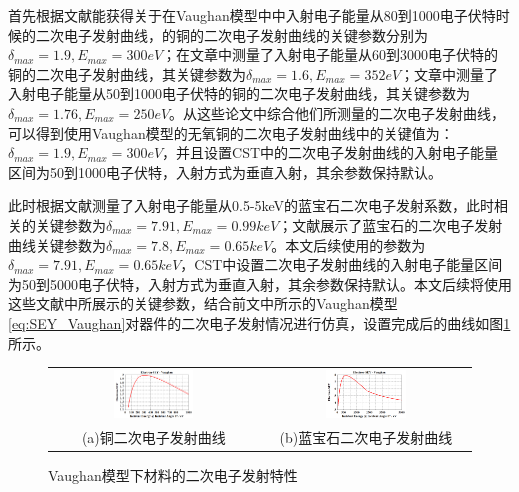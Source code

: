 \documentclass[master]{thesis-uestc}
\begin{document}
首先根据文献\cite{valizadeh_2014_wja}能获得关于在Vaughan模型中中入射电子能量从80到1000电子伏特时候的二次电子发射曲线，的铜的二次电子发射曲线的关键参数分别为$\delta_{max}=1.9, E_{max}=300 eV$；在文章\cite{bojko_2020_see}中测量了入射电子能量从60到3000电子伏特的铜的二次电子发射曲线，其关键参数为$\delta_{max}=1.6, E_{max}=352 eV$；文章\cite{jianweifang_lizi_2023}中测量了入射电子能量从50到1000电子伏特的铜的二次电子发射曲线，其关键参数为$\delta_{max}=1.76, E_{max}=250 eV$。从这些论文中综合他们所测量的二次电子发射曲线，可以得到使用Vaughan模型的无氧铜的二次电子发射曲线中的关键值为：$\delta_{max}=1.9, E_{max}=300 eV$，并且设置CST中的二次电子发射曲线的入射电子能量区间为50到1000电子伏特，入射方式为垂直入射，其余参数保持默认。

此时根据文献\cite{suharyanto_2006_secondary}测量了入射电子能量从0.5-5keV的蓝宝石二次电子发射系数，此时相关的关键参数为$\delta_{max}=7.91, E_{max}=0.99keV$；文献\cite{chvyreva_2014_experimental}展示了蓝宝石的二次电子发射曲线关键参数为$\delta_{max}=7.8, E_{max}=0.65keV$。本文后续使用的参数为$\delta_{max}=7.91, E_{max}=0.65keV$，CST中设置二次电子发射曲线的入射电子能量区间为50到5000电子伏特，入射方式为垂直入射，其余参数保持默认。本文后续将使用这些文献中所展示的关键参数，结合前文中所示的Vaughan模型\ref{eq:SEY_Vaughan}对器件的二次电子发射情况进行仿真，设置完成后的曲线如图\ref{fig:X波段材料二次电子发射特性}所示。
\begin{figure}[!htb]
    \small
    \centering
    \begin{tabular}{@{\ }c@{\ }c}
        \includegraphics[width=0.4\textwidth]{pic/chapter3/铜的SEY.png} & 
        \hspace{5pt}
        \includegraphics[width=0.4\textwidth]{pic/chapter3/蓝宝石的SEY.png}     \\
        \mbox{\small (a)铜二次电子发射曲线}                                                                               & 
        \mbox{\small (b)蓝宝石二次电子发射曲线}                                                                                  \\
    \end{tabular}
    \caption{Vaughan模型下材料的二次电子发射特性}
    \label{fig:X波段材料二次电子发射特性}
\end{figure}
\end{document}
